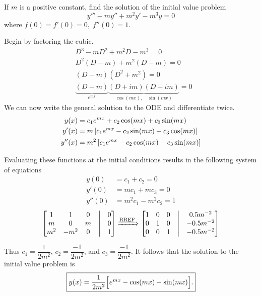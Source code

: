 If $m$ is a positive constant, find the solution of the initial value problem
$$y''' - my'' + m^2 y' - m^3 y = 0$$
where $f(0) = f'(0) = 0, \; f''(0) = 1.$

\soln Begin by factoring the cubic. \begin{align*}
  &D^3 - mD^2 + m^2 D - m^3 = 0\\
  &D^2(D-m) + m^2(D-m) = 0\\
  &(D-m)(D^2 + m^2) = 0\\
  &\underbrace{(D-m)}_{e^{mx}} \underbrace{(D+im)(D-im)}_{\cos(mx),\quad \sin(mx)} = 0
\end{align*}
We can now write the general solution to the ODE and differentiate twice.
\begin{align*}
  y(x) &= c_1 e^{mx} + c_2 \cos (mx) + c_3 \sin (mx)\\
  y'(x) &= m \brac{ c_1 e^{mx} - c_2 \sin (mx) + c_3 \cos(mx)}\\
  y''(x) &= m^2 \brac{ c_1 e^{mx} - c_2 \cos (mx) - c_3 \sin (mx)}
 \end{align*}

 Evaluating these functions at the initial conditions results in the following system of equations
  \begin{align*}
    y(0) &= c_1 + c_2 = 0\\
    y'(0) &= mc_1 + mc_3 = 0\\
    y''(0) &= m^2  c_1 - m^2 c_2 = 1
   \end{align*}
   $$\begin{bmatrix}
    1 & 1 & 0 & \bigm| & 0 \\
    m & 0 & m & \bigm| & 0 \\
    m^2 & -m^2 & 0 & \bigm| & 1
  \end{bmatrix} \xRightarrow{\text{RREF}} \begin{bmatrix}
    1 & 0 & 0 & \bigm| & 0.5m^{-2} \\
    0 & 1 & 0 & \bigm| & -0.5m^{-2}   \\
    0 & 0 & 1 & \bigm| & -0.5m^{-2}  
  \end{bmatrix}$$

  Thus $c_1 = \dfrac{1}{2m^2}$, $c_2 = \dfrac{-1}{2m^2}$, and $c_3 = \dfrac{-1}{2m^2}$. It follows that the solution to the initial value problem is  
  $$\boxed{$$y(x) = \dfrac{1}{2m^2} \Big[ { e^{mx} - \cos(mx) - \sin(mx)} \Big]
.$$}$$
